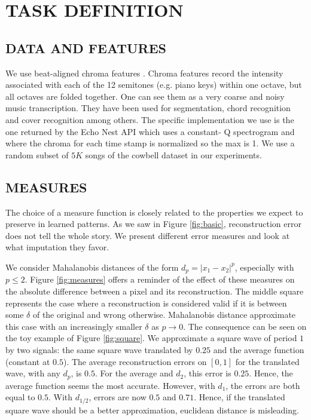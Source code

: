 \documentclass{article}
\begin{document}
\section{TASK DEFINITION}
\label{sec:task}

\subsection{DATA AND FEATURES}
\label{ssec:feats}
We use beat-aligned chroma features \cite{Ellis2007a}. Chroma features
record the intensity associated with each of the 12 semitones
(e.g. piano keys) within one octave, but all octaves
are folded together. One can see them as a very coarse and
noisy music transcription. They have been used for segmentation, 
chord recognition and cover recognition
among others. The specific implementation we use is the one
returned by the Echo Nest API \cite{EchoNest} which uses a constant-
Q spectrogram and where the chroma for each time stamp is
normalized so the max is 1. We use a random subset of $5K$ songs of
the cowbell dataset \cite{Bertin-Mahieux2010a} in our experiments.

\subsection{MEASURES}
\label{ssec:measures}
The choice of a measure function is closely related to the properties
we expect to preserve in learned patterns. As we saw in Figure
\ref{fig:basic}, reconstruction error does not tell the whole story.
We present different error measures and look at what imputation they
favor.

We consider Mahalanobis distances of the form $d_p = |x_1-x_2|^p$, especially
with $p \leq 2$. Figure \ref{fig:measures} offers a reminder of the effect
of these measures on the absolute difference between a pixel and
its reconstruction. The middle square represents the case where a
reconstruction is considered valid if it is between some $\delta$ of
the original and wrong otherwise. Mahalanobis distance approximate
this case with an increasingly smaller $\delta$ as $p \rightarrow 0$.
The consequence can be seen on the toy example of 
Figure \ref{fig:square}. We approximate a square wave of period $1$
by two signals: the same square wave translated by $0.25$ and the
average function (constant at $0.5$). The average reconstruction 
errors on $[0,1]$ for the translated wave, with any $d_p$, is $0.5$.
For the average and $d_2$, this error is $0.25$.
Hence, the average function seems the most accurate. However,
with $d_1$, the errors are both equal to $0.5$. With $d_{1/2}$,
errors are now $0.5$ and $0.71$. Hence, if the translated square wave
should be a better approximation, euclidean distance is misleading.
\end{document}
